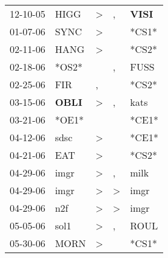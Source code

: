 \begin{supertabular}{p{0.07\textwidth}p{0.06\textwidth}p{0.02\textwidth}p{0.02\textwidth}p{0.06\textwidth}}
          12-10-05\textsuperscript{} &           HIGG\textsuperscript{} &     \textgreater &                , &  \textbf{VISI\textsuperscript{}} \\
          01-07-06\textsuperscript{} &           SYNC\textsuperscript{} &     \textgreater &                  &                            *CS1* \\
          02-11-06\textsuperscript{} &           HANG\textsuperscript{} &     \textgreater &                  &                            *CS2* \\
          02-18-06\textsuperscript{} &                            *OS2* &                  &                , &           FUSS\textsuperscript{} \\
          02-25-06\textsuperscript{} &            FIR\textsuperscript{} &                , &                  &                            *CS2* \\
          03-15-06\textsuperscript{} &  \textbf{OBLI\textsuperscript{}} &     \textgreater &                , &           kats\textsuperscript{} \\
          03-21-06\textsuperscript{} &                            *OE1* &                  &                  &                            *CE1* \\
          04-12-06\textsuperscript{} &           sdsc\textsuperscript{} &     \textgreater &                  &                            *CE1* \\
          04-21-06\textsuperscript{} &            EAT\textsuperscript{} &     \textgreater &                  &                            *CS2* \\
          04-29-06\textsuperscript{} &           imgr\textsuperscript{} &     \textgreater &                , &           milk\textsuperscript{} \\
          04-29-06\textsuperscript{} &           imgr\textsuperscript{} &     \textgreater &     \textgreater &           imgr\textsuperscript{} \\
          04-29-06\textsuperscript{} &            n2f\textsuperscript{} &     \textgreater &     \textgreater &           imgr\textsuperscript{} \\
          05-05-06\textsuperscript{} &           sol1\textsuperscript{} &     \textgreater &                , &           ROUL\textsuperscript{} \\
          05-30-06\textsuperscript{} &           MORN\textsuperscript{} &     \textgreater &                  &                            *CS1* \\

\end{supertabular}
